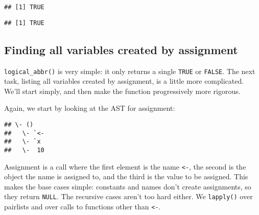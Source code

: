 \begin{verbatim}
## [1] TRUE
\end{verbatim}

\begin{Shaded}
\begin{Highlighting}[]
\NormalTok{(}\NormalTok{(}\NormalTok{))}
\end{Highlighting}
\end{Shaded}

\begin{verbatim}
## [1] TRUE
\end{verbatim}

\hypertarget{finding-all-variables-created-by-assignment}{%
\subsection{Finding all variables created by
assignment}\label{finding-all-variables-created-by-assignment}}

\texttt{logical\_abbr()} is very simple: it only returns a single
\texttt{TRUE} or \texttt{FALSE}. The next task, listing all variables
created by assignment, is a little more complicated. We'll start simply,
and then make the function progressively more rigorous.

Again, we start by looking at the AST for assignment:

\begin{Shaded}
\begin{Highlighting}[]
\StringTok{ }\NormalTok{)}
\end{Highlighting}
\end{Shaded}

\begin{verbatim}
## \- ()
##   \- `<-
##   \- `x
##   \-  10
\end{verbatim}

Assignment is a call where the first element is the name
\texttt{\textless{}-}, the second is the object the name is assigned to,
and the third is the value to be assigned. This makes the base cases
simple: constants and names don't create assignments, so they return
\texttt{NULL}. The recursive cases aren't too hard either. We
\texttt{lapply()} over pairlists and over calls to functions other than
\texttt{\textless{}-}.

